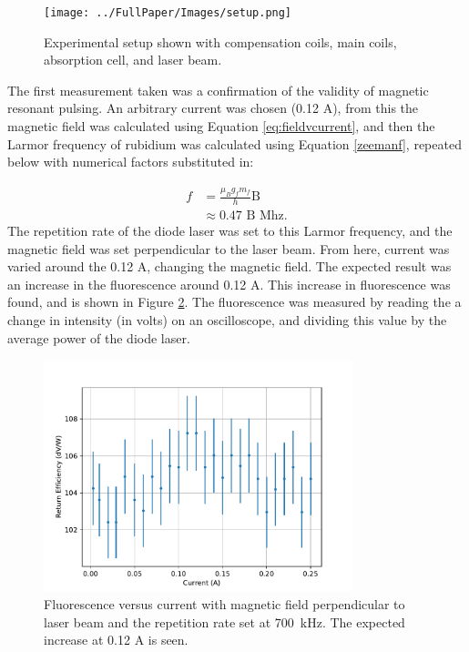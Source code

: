 \documentclass[]{revtex4}
\begin{document}
\begin{figure}[htpb]
	\centering
	\texttt{[image: ../FullPaper/Images/setup.png]}
	\caption{Experimental setup shown with compensation coils, main coils, absorption cell, and laser beam.}
	\label{fig:expsetupactual}
\end{figure}

The first measurement taken was a confirmation of the validity of magnetic resonant pulsing. An arbitrary current was chosen (0.12 A), from this the magnetic field was calculated using Equation \ref{eq:fieldvcurrent}, and then the Larmor frequency of rubidium was calculated using Equation \ref{zeemanf}, repeated below with numerical factors substituted in:

\begin{equation}
	\begin{split}
		f & = \frac{\mu_B g_f m_f}{h} \text{B}\\
		  & \approx 0.47 \text{ B Mhz}.
\end{split}
	\label{eq:larmorvB}
\end{equation}
%
The repetition rate of the diode laser was set to this Larmor frequency, and the magnetic field was set perpendicular to the laser beam. From here, current was varied around the 0.12 A, changing the magnetic field. The expected result was an increase in the fluorescence around 0.12 A. This increase in fluorescence was found, and is shown in Figure \ref{fig:flvc}. The fluorescence was measured by reading the a change in intensity (in volts) on an oscilloscope, and dividing this value by the average power of the diode laser.


\begin{figure}[htpb]
	\centering
	\includegraphics[width=0.8\textwidth]{../FullPaper/../../MRPData/EfficiencyCurr.pdf}
	\caption{Fluorescence versus current with magnetic field perpendicular to laser beam and the repetition rate set at \SI{700}{ kHz}. The expected increase at 0.12 A is seen.}
	\label{fig:flvc}
\end{figure}
\end{document}
